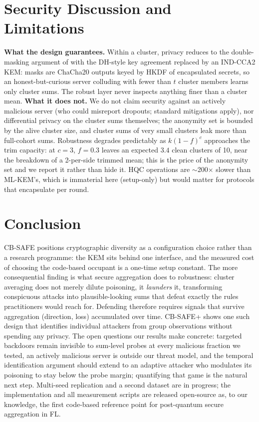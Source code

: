 \documentclass[conference]{IEEEtran}
\begin{document}
\section{Security Discussion and Limitations}
\textbf{What the design guarantees.} Within a cluster, privacy reduces to the
double-masking argument of \cite{bonawitz2017} with the DH-style key agreement
replaced by an IND-CCA2 KEM: masks are ChaCha20 outputs keyed by HKDF of
encapsulated secrets, so an honest-but-curious server colluding with fewer than $t$
cluster members learns only cluster sums. The robust layer never inspects anything
finer than a cluster mean. \textbf{What it does not.} We do not claim security
against an actively malicious server (who could misreport dropouts; standard
mitigations apply), nor differential privacy on the cluster sums themselves; the
anonymity set is bounded by the alive cluster size, and cluster sums of very small
clusters leak more than full-cohort sums. Robustness degrades predictably as
$k(1-f)^c$ approaches the trim capacity: at $c{=}3$, $f{=}0.3$ leaves an expected
$3.4$ clean clusters of 10, near the breakdown of a 2-per-side trimmed mean; this
is the price of the anonymity set and we report it rather than hide it. HQC
operations are $\sim$200$\times$ slower than ML-KEM's, which is immaterial here
(setup-only) but would matter for protocols that encapsulate per round.

\section{Conclusion}
CB-SAFE positions cryptographic diversity as a configuration choice rather than a
research programme: the KEM sits behind one interface, and the measured cost of
choosing the code-based occupant is a one-time setup constant. The more consequential
finding is what secure aggregation does to robustness: cluster averaging does not
merely dilute poisoning, it \emph{launders} it, transforming conspicuous attacks
into plausible-looking sums that defeat exactly the rules practitioners would reach
for. Defending therefore requires signals that survive aggregation (direction,
loss) accumulated over time. CB-SAFE+ shows one such design that identifies
individual attackers from group observations without spending any privacy. The open
questions our results make concrete: targeted backdoors remain invisible to
sum-level probes at every malicious fraction we tested, an actively malicious server
is outside our threat model, and the temporal identification argument should extend
to an adaptive attacker who modulates its poisoning to stay below the probe margin;
quantifying that game is the natural next step. Multi-seed replication and a
second dataset are in progress; the implementation and all measurement scripts are
released open-source as, to our knowledge, the first code-based reference point for
post-quantum secure aggregation in FL.
\end{document}
